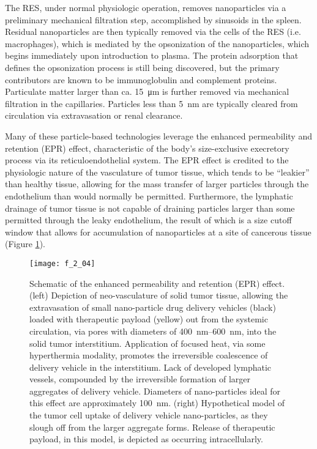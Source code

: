\begin{refsection}
The RES, under normal physiologic operation, removes nanoparticles via
a preliminary mechanical filtration step, accomplished by sinusoids in the
spleen.\cite{Moghimi2001} Residual nanoparticles are then typically removed via
the cells of the RES (i.e. macrophages), which is mediated by the opsonization
of the nanoparticles, which begins immediately upon introduction to plasma. The
protein adsorption that defines the opsonization process is still being
discovered, but the primary contributors are known to be immunoglobulin and
complement proteins.\cite{Petros2010} Particulate matter larger than ca.
\SI{15}{\um} is further removed via mechanical filtration in the
capillaries.\cite{Ilium1982} Particles less than \SI{5}{\nm} are typically
cleared from circulation via extravasation or renal clearance.\cite{Choi2007}

Many of these particle-based technologies
leverage the enhanced permeability and retention (EPR) effect, characteristic of
the body's size-exclusive execretory process via its reticuloendothelial
system.\cite{Matsumura1986,Fang2010} The EPR effect is credited to the
physiologic nature of the vasculature of tumor tissue, which tends to be
``leakier'' than healthy tissue, allowing for the mass transfer of larger
particles through the endothelium than would normally be permitted. Furthermore,
the lymphatic drainage of tumor tissue is not capable of draining particles
larger than some permitted through the leaky endothelium, the result of which
is a size cutoff window that allows for accumulation of nanoparticles at a site
of cancerous tissue (Figure \ref{fig:EPR_effect}).
\begin{figure}[h!] \centering \texttt{[image: f\_2\_04]}
    \caption{Schematic of the enhanced permeability and retention (EPR) effect. (left)
Depiction of neo-vasculature of solid tumor tissue, allowing the extravasation
of small nano-particle drug delivery vehicles (black) loaded with therapeutic
payload (yellow) out from the systemic circulation, via pores with 
diameters of \SIrange{400}{600}{\nm},\cite{Yuan1995} into the solid tumor
interstitium. Application of focused heat, via some hyperthermia modality,
promotes the irreversible coalescence of delivery vehicle in the interstitium.
Lack of developed lymphatic vessels, compounded by the irreversible formation of
larger aggregates of delivery vehicle. Diameters of nano-particles ideal for
this effect are approximately \SI{100}{\nm}.\cite{Charrois2003} (right) Hypothetical model of the tumor
cell uptake of delivery vehicle nano-particles, as they slough off from the
larger aggregate forms. Release of therapeutic payload, in this model, is
depicted as occurring intracellularly.}\label{fig:EPR_effect} \end{figure}


\end{refsection}
